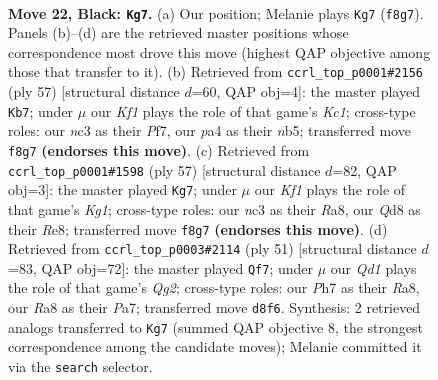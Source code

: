 \documentclass[11pt]{article}
\begin{document}
\clearpage

\begin{figure}[p]\centering
\begin{subfigure}{0.46\textwidth}\centering
\resizebox{\linewidth}{!}{%
\newchessgame
\chessboard[
  setfen={r2q1k1r/3p3p/n2P4/2pQ4/P4RP1/2N5/1P6/R3K3 b Q - 0 22},
  showmover=false,
  pgfstyle=straightmove, color=movearrow, markmove={f8-g7}
]}
\caption{}
\end{subfigure}\hfill
\begin{subfigure}{0.46\textwidth}\centering
\resizebox{\linewidth}{!}{%
\newchessgame
\chessboard[
  setfen={2kq3r/5pp1/3Qp3/pNn1P3/2r2P2/6P1/6R1/4R1K1 b - - 0 29},
  showmover=false,
  pgfstyle=straightmove, color=movearrow, markmove={c8-b7}
]}
\caption{}
\end{subfigure}
\\[4pt]
\begin{subfigure}{0.46\textwidth}\centering
\resizebox{\linewidth}{!}{%
\newchessgame
\chessboard[
  setfen={r3r1k1/n2b1p2/Bq4p1/3pP3/7Q/5NP1/PP6/R1R4K b - - 6 29},
  showmover=false,
  pgfstyle=straightmove, color=movearrow, markmove={g8-g7}
]}
\caption{}
\end{subfigure}\hfill
\begin{subfigure}{0.46\textwidth}\centering
\resizebox{\linewidth}{!}{%
\newchessgame
\chessboard[
  setfen={r4kr1/p5q1/4R3/8/Np3Q1P/8/PP3P2/4K2b b - - 2 26},
  showmover=false,
  pgfstyle=straightmove, color=movearrow, markmove={g7-f7}
]}
\caption{}
\end{subfigure}
\caption{\textbf{Move 22, Black: \texttt{Kg7}.} (a) Our position; Melanie plays \texttt{Kg7} (\texttt{f8g7}). Panels (b)--(d) are the retrieved master positions whose correspondence most drove this move (highest QAP objective among those that transfer to it). (b) Retrieved from \texttt{ccrl\_top\_p0001\#2156} (ply 57) [structural distance $d$=60, QAP obj=4]: the master played \texttt{Kb7}; under $\mu$ our \emph{Kf1} plays the role of that game's \emph{Kc1}; cross-type roles: our \emph{n}c3 as their \emph{P}f7, our \emph{p}a4 as their \emph{n}b5; transferred move \texttt{f8g7} \textbf{(endorses this move)}. (c) Retrieved from \texttt{ccrl\_top\_p0001\#1598} (ply 57) [structural distance $d$=82, QAP obj=3]: the master played \texttt{Kg7}; under $\mu$ our \emph{Kf1} plays the role of that game's \emph{Kg1}; cross-type roles: our \emph{n}c3 as their \emph{R}a8, our \emph{Q}d8 as their \emph{R}e8; transferred move \texttt{f8g7} \textbf{(endorses this move)}. (d) Retrieved from \texttt{ccrl\_top\_p0003\#2114} (ply 51) [structural distance $d$=83, QAP obj=72]: the master played \texttt{Qf7}; under $\mu$ our \emph{Qd1} plays the role of that game's \emph{Qg2}; cross-type roles: our \emph{P}h7 as their \emph{R}a8, our \emph{R}a8 as their \emph{P}a7; transferred move \texttt{d8f6}. Synthesis: 2 retrieved analogs transferred to \texttt{Kg7} (summed QAP objective 8, the strongest correspondence among the candidate moves); Melanie committed it via the \texttt{search} selector.}
\label{fig:thought-m43}
\end{figure}
\end{document}
